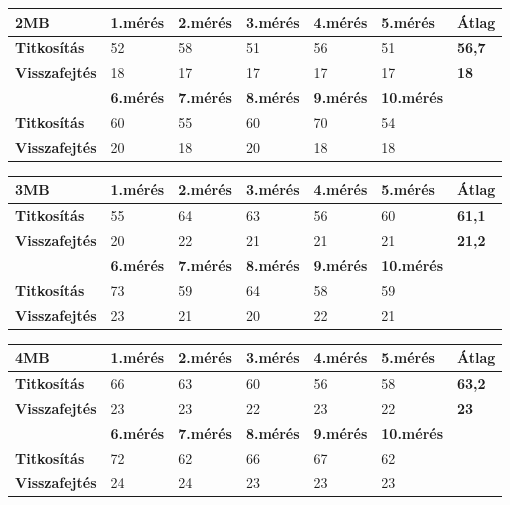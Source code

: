 \begin{center}
	
	
	\begin{tabular}{|p{2.4cm}|p{1.7cm}|p{1.7cm}|p{1.7cm}|p{1.7cm}|p{1.8cm}|p{1.2cm}|}
		\hline
		\textbf{2MB} & \textbf{1.mérés} & \textbf{2.mérés} & \textbf{3.mérés} & \textbf{4.mérés} & \textbf{5.mérés} & \textbf{Átlag} \\
		\hline
		\textbf{Titkosítás} & 52 & 58 & 51 & 56 & 51 & \textbf{56,7} \\
		\hline
		\textbf{Visszafejtés} &18 & 17 & 17 & 17 & 17 &	\textbf{18}  \\
		\hline
		& \textbf{6.mérés} & \textbf{7.mérés} & \textbf{8.mérés} & \textbf{9.mérés} & \textbf{10.mérés} & \\
		\hline
		\textbf{Titkosítás} & 60 & 55 & 60 & 70 & 54 & \\
		\hline
		\textbf{Visszafejtés} & 20 & 18 & 20 & 18 & 18 & \\
		\hline
	\end{tabular}
\end{center}

\begin{center}
	
	
	\begin{tabular}{|p{2.4cm}|p{1.7cm}|p{1.7cm}|p{1.7cm}|p{1.7cm}|p{1.8cm}|p{1.2cm}|}
		\hline
		\textbf{3MB} & \textbf{1.mérés} & \textbf{2.mérés} & \textbf{3.mérés} & \textbf{4.mérés} & \textbf{5.mérés} & \textbf{Átlag} \\
		\hline
		\textbf{Titkosítás}&55&64&63&56&60&\textbf{61,1} \\
		\hline
		\textbf{Visszafejtés}&20&22&21&21&21&\textbf{21,2} \\
		\hline
		& \textbf{6.mérés} & \textbf{7.mérés} & \textbf{8.mérés} & \textbf{9.mérés} & \textbf{10.mérés} & \\
		\hline
		\textbf{Titkosítás}&73&59&64&58&59& \\
		\hline
		\textbf{Visszafejtés}&23&21&20&22&21& \\
		\hline
	\end{tabular}
\end{center}

\begin{center}
	
	
	\begin{tabular}{|p{2.4cm}|p{1.7cm}|p{1.7cm}|p{1.7cm}|p{1.7cm}|p{1.8cm}|p{1.2cm}|}
		\hline
		\textbf{4MB} & \textbf{1.mérés} & \textbf{2.mérés} & \textbf{3.mérés} & \textbf{4.mérés} & \textbf{5.mérés} & \textbf{Átlag} \\
		\hline
		\textbf{Titkosítás}&66&63&60&56&58&\textbf{63,2} \\
		\hline
		\textbf{Visszafejtés}&23&23&22&23&22&\textbf{23} \\
		\hline
		& \textbf{6.mérés} & \textbf{7.mérés} & \textbf{8.mérés} & \textbf{9.mérés} & \textbf{10.mérés} & \\
		\hline
		\textbf{Titkosítás}&72&62&66&67&62&\\
		\hline
		\textbf{Visszafejtés}&24&24&23&23&23& \\
		\hline
	\end{tabular}
\end{center}

